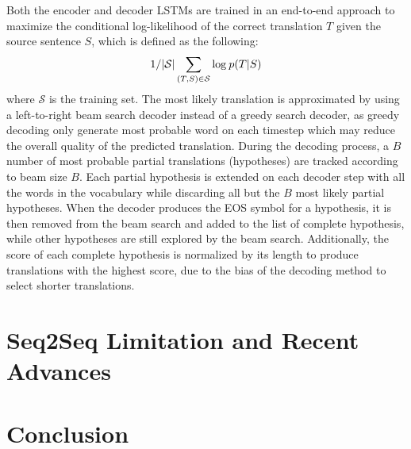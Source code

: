 \documentclass[12pt]{extarticle}
\begin{document}
Both the encoder and decoder LSTMs are trained in an end-to-end approach to maximize the conditional log-likelihood of the correct translation $T$ given the source sentence $S$, which is defined as the following:
\begin{align}
1/ |\mathcal{S}| \sum_{(T,S) \in \mathcal{S}} \textnormal{log}\: p(T|S)
\end{align}
where $\mathcal{S}$ is the training set. The most likely translation is approximated by using a left-to-right beam search decoder instead of a greedy search decoder, as greedy decoding only generate most probable word on each timestep which may reduce the overall quality of the predicted translation. During the decoding process, a $B$ number of most probable partial translations (hypotheses) are tracked according to beam size $B$. Each partial hypothesis is extended on each decoder step with all the words in the vocabulary while discarding all but the $B$ most likely partial hypotheses. When the decoder produces the EOS symbol for a hypothesis, it is then removed from the beam search and added to the list of complete hypothesis, while other hypotheses are still explored by the beam search. Additionally, the score of each complete hypothesis is normalized by its length to produce translations with the highest score, due to the bias of the decoding method to select shorter translations.


\section*{Seq2Seq Limitation and Recent Advances} %

\section*{Conclusion}
\end{document}
